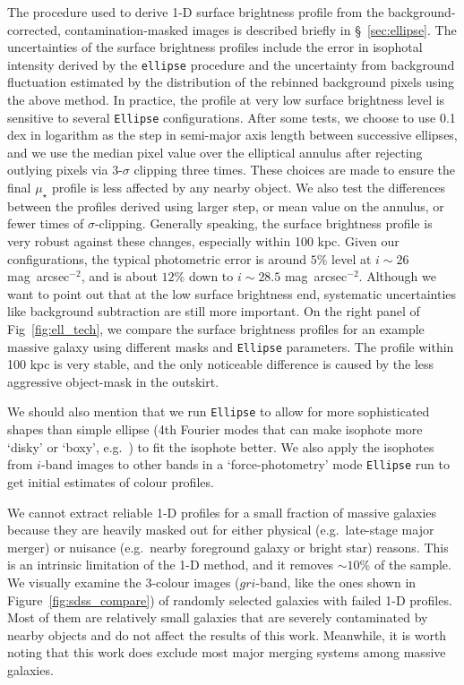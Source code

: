 \documentclass[fleqn,usenatbib]{mnras}
\def\sb{mag~arcsec$^{-2}$}
\def\mden{{$\mu_{\star}$}}
\begin{document}
    The procedure used to derive 1-D surface brightness profile from the 
    background-corrected, contamination-masked images is  described briefly in 
    \S~\ref{sec:ellipse}. 
    The uncertainties of the surface brightness profiles include the error in 
    isophotal intensity derived by the \texttt{ellipse} procedure and the 
    uncertainty from background fluctuation estimated by the distribution of the 
    rebinned background pixels using the above method. 
    In practice, the profile at very low surface brightness level is sensitive to 
    several \texttt{Ellipse} configurations.
    After some tests, we choose to use 0.1 dex in logarithm as the step in semi-major 
    axis length between successive ellipses, and we use the median pixel value over 
    the elliptical annulus after rejecting outlying pixels via 3-$\sigma$ clipping 
    three times.
    These choices are made to ensure the final \mden{} profile is less affected by 
    any nearby object. 
    We also test the differences between the profiles derived using larger
    step, or mean value on the annulus, or fewer times of $\sigma$-clipping. 
    Generally speaking, the surface brightness profile is very robust against these
    changes, especially within 100 kpc. 
    Given our configurations, the typical photometric error is around $5$\% level
    at $i\sim 26$ \sb{}, and is about $12$\% down to $i\sim 28.5$ \sb{}. 
    Although we want to point out that at the low surface brightness end, 
    systematic uncertainties like background subtraction are still more important.
    On the right panel of Fig~\ref{fig:ell_tech}, we compare the surface brightness
    profiles for an example massive galaxy using different masks and \texttt{Ellipse}
    parameters. 
    The profile within 100 kpc is very stable, and the only noticeable difference 
    is caused by the less aggressive object-mask in the outskirt.    
    
    We should also mention that we run \texttt{Ellipse} to allow for more 
    sophisticated shapes than simple ellipse (4th Fourier modes that can make 
    isophote more `disky' or `boxy', e.g.\ \citealt{Kormendy2009}) to fit the 
    isophote better.
    We also apply the isophotes from $i$-band images to other bands in a
    `force-photometry' mode \texttt{Ellipse} run to get initial estimates of 
    colour profiles.  
    
    We cannot extract reliable 1-D profiles for a small fraction of massive
    galaxies because they are heavily masked out for either physical 
    (e.g.\ late-stage major merger) or nuisance (e.g.\ nearby foreground 
    galaxy or bright star) reasons. 
    This is an intrinsic limitation of the 1-D method, and it removes ${\sim}10$\% 
    of the sample.
    We visually examine the 3-colour images ($gri$-band, like the ones shown in 
    Figure~\ref{fig:sdss_compare}) of randomly selected galaxies with 
    failed 1-D profiles.  
    Most of them are relatively small galaxies that are severely contaminated by 
    nearby objects and do not affect the results of this work.  
    Meanwhile, it is worth noting that this work does exclude most major merging 
    systems among massive galaxies. 
\end{document}
